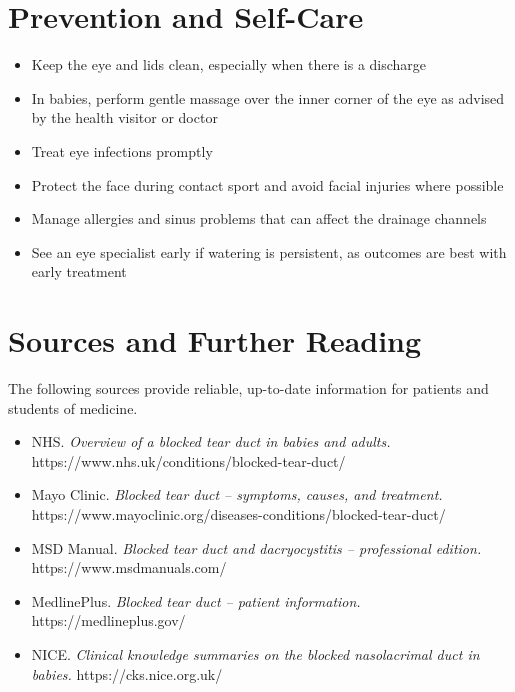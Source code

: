 \section*{Prevention and Self-Care}
\begin{itemize}
    \item Keep the eye and lids clean, especially when there is a discharge
    \item In babies, perform gentle massage over the inner corner of the eye as advised by the health visitor or doctor
    \item Treat eye infections promptly
    \item Protect the face during contact sport and avoid facial injuries where possible
    \item Manage allergies and sinus problems that can affect the drainage channels
    \item See an eye specialist early if watering is persistent, as outcomes are best with early treatment
\end{itemize}

\section*{Sources and Further Reading}
The following sources provide reliable, up-to-date information for patients and students of medicine.

\begin{itemize}
    \item NHS. \textit{Overview of a blocked tear duct in babies and adults.} https://www.nhs.uk/conditions/blocked-tear-duct/
    \item Mayo Clinic. \textit{Blocked tear duct -- symptoms, causes, and treatment.} https://www.mayoclinic.org/diseases-conditions/blocked-tear-duct/
    \item MSD Manual. \textit{Blocked tear duct and dacryocystitis -- professional edition.} https://www.msdmanuals.com/
    \item MedlinePlus. \textit{Blocked tear duct -- patient information.} https://medlineplus.gov/
    \item NICE. \textit{Clinical knowledge summaries on the blocked nasolacrimal duct in babies.} https://cks.nice.org.uk/
\end{itemize}
